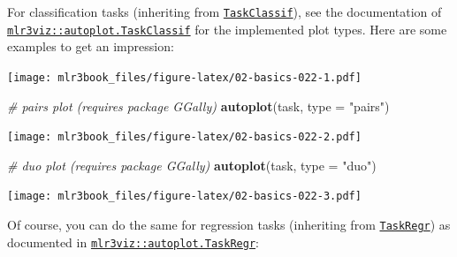 \documentclass[]{article}
\newenvironment{Shaded}{\begin{snugshade}}{\end{snugshade}}
\newcommand{\CommentTok}[1]{\textcolor[rgb]{0.56,0.35,0.01}{\textit{#1}}}
\newcommand{\DataTypeTok}[1]{\textcolor[rgb]{0.13,0.29,0.53}{#1}}
\newcommand{\DecValTok}[1]{\textcolor[rgb]{0.00,0.00,0.81}{#1}}
\newcommand{\KeywordTok}[1]{\textcolor[rgb]{0.13,0.29,0.53}{\textbf{#1}}}
\newcommand{\NormalTok}[1]{#1}
\newcommand{\OperatorTok}[1]{\textcolor[rgb]{0.81,0.36,0.00}{\textbf{#1}}}
\newcommand{\StringTok}[1]{\textcolor[rgb]{0.31,0.60,0.02}{#1}}
\renewenvironment{Shaded} {\begin{snugshade}\small} {\end{snugshade}}
\begin{document}
For classification tasks (inheriting from \href{https://mlr3.mlr-org.com/reference/TaskClassif.html}{\texttt{TaskClassif}}), see the documentation of \href{https://mlr3viz.mlr-org.com/reference/autoplot.TaskClassif.html}{\texttt{mlr3viz::autoplot.TaskClassif}} for the implemented plot types.
Here are some examples to get an impression:

\begin{Shaded}
\end{Shaded}

\texttt{[image: mlr3book\_files/figure-latex/02-basics-022-1.pdf]}

\begin{Shaded}
\begin{Highlighting}[]
\CommentTok{# pairs plot (requires package GGally)}
\KeywordTok{autoplot}\NormalTok{(task, }\DataTypeTok{type =} \StringTok{"pairs"}\NormalTok{)}
\end{Highlighting}
\end{Shaded}

\texttt{[image: mlr3book\_files/figure-latex/02-basics-022-2.pdf]}

\begin{Shaded}
\begin{Highlighting}[]
\CommentTok{# duo plot (requires package GGally)}
\KeywordTok{autoplot}\NormalTok{(task, }\DataTypeTok{type =} \StringTok{"duo"}\NormalTok{)}
\end{Highlighting}
\end{Shaded}

\texttt{[image: mlr3book\_files/figure-latex/02-basics-022-3.pdf]}

Of course, you can do the same for regression tasks (inheriting from \href{https://mlr3.mlr-org.com/reference/TaskRegr.html}{\texttt{TaskRegr}}) as documented in \href{https://mlr3viz.mlr-org.com/reference/autoplot.TaskRegr.html}{\texttt{mlr3viz::autoplot.TaskRegr}}:
\end{document}

